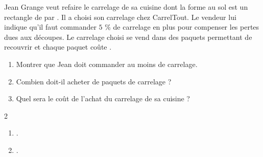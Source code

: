 \begin{exercice*}[Carrelage]
    Jean Grange veut refaire le carrelage de sa cuisine dont la forme au sol est un 
    rectangle de  par . Il a choisi son carrelage chez CarrelTout. Le vendeur
    lui indique qu'il faut commander $5$ \% de carrelage en plus pour compenser les
    pertes dues aux découpes. Le carrelage choisi se vend dans des paquets permettant de 
    recouvrir  et chaque paquet coûte .    
    \begin{enumerate}
        \item Montrer que Jean doit commander au moins  de carrelage.
        \item Combien doit-il acheter de paquets de carrelage ?
        \item Quel sera le coût de l'achat du carrelage de sa cuisine ?    
    \end{enumerate}
\end{exercice*}
\begin{corrige}
    \phantom{rrr}    
    \begin{multicols}2
        \begin{enumerate}
            \item .
            \item .
        \end{enumerate}
    \end{multicols}
\end{corrige}

